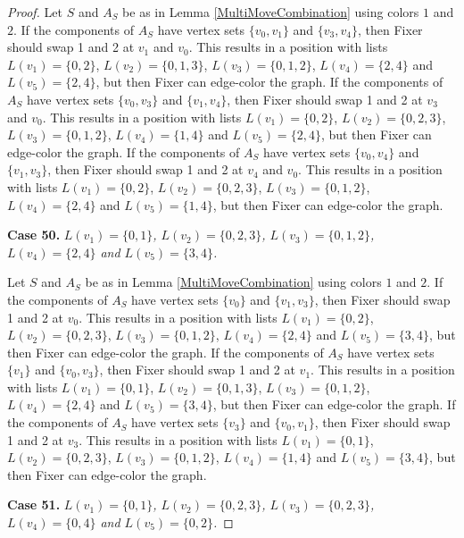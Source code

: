 \documentclass[12pt]{amsart}
\theoremstyle{plain}
\theoremstyle{definition}
\theoremstyle{remark}
\begin{document}
\begin{proof}
Let $S$ and $A_S$ be as in Lemma \ref{MultiMoveCombination} using colors $1$ and $2$. If the components of $A_S$ have vertex sets $\{v_0, v_1\}$ and $\{v_3, v_4\}$, then Fixer should swap 1 and 2 at $v_1$ and $v_0$. This results in a position with lists $L(v_1) = \{0, 2\}$, $L(v_2) = \{0, 1, 3\}$, $L(v_3) = \{0, 1, 2\}$, $L(v_4) = \{2, 4\}$ and $L(v_5) = \{2, 4\}$, but then Fixer can edge-color the graph.
If the components of $A_S$ have vertex sets $\{v_0, v_3\}$ and $\{v_1, v_4\}$, then Fixer should swap 1 and 2 at $v_3$ and $v_0$. This results in a position with lists $L(v_1) = \{0, 2\}$, $L(v_2) = \{0, 2, 3\}$, $L(v_3) = \{0, 1, 2\}$, $L(v_4) = \{1, 4\}$ and $L(v_5) = \{2, 4\}$, but then Fixer can edge-color the graph.
If the components of $A_S$ have vertex sets $\{v_0, v_4\}$ and $\{v_1, v_3\}$, then Fixer should swap 1 and 2 at $v_4$ and $v_0$. This results in a position with lists $L(v_1) = \{0, 2\}$, $L(v_2) = \{0, 2, 3\}$, $L(v_3) = \{0, 1, 2\}$, $L(v_4) = \{2, 4\}$ and $L(v_5) = \{1, 4\}$, but then Fixer can edge-color the graph.

\noindent\textbf{Case 50.  }\textit{$L(v_1) = \{0, 1\}$, $L(v_2) = \{0, 2, 3\}$, $L(v_3) = \{0, 1, 2\}$, $L(v_4) = \{2, 4\}$ and $L(v_5) = \{3, 4\}$.}

Let $S$ and $A_S$ be as in Lemma \ref{MultiMoveCombination} using colors $1$ and $2$. If the components of $A_S$ have vertex sets $\{v_0\}$ and $\{v_1, v_3\}$, then Fixer should swap 1 and 2 at $v_0$. This results in a position with lists $L(v_1) = \{0, 2\}$, $L(v_2) = \{0, 2, 3\}$, $L(v_3) = \{0, 1, 2\}$, $L(v_4) = \{2, 4\}$ and $L(v_5) = \{3, 4\}$, but then Fixer can edge-color the graph.
If the components of $A_S$ have vertex sets $\{v_1\}$ and $\{v_0, v_3\}$, then Fixer should swap 1 and 2 at $v_1$. This results in a position with lists $L(v_1) = \{0, 1\}$, $L(v_2) = \{0, 1, 3\}$, $L(v_3) = \{0, 1, 2\}$, $L(v_4) = \{2, 4\}$ and $L(v_5) = \{3, 4\}$, but then Fixer can edge-color the graph.
If the components of $A_S$ have vertex sets $\{v_3\}$ and $\{v_0, v_1\}$, then Fixer should swap 1 and 2 at $v_3$. This results in a position with lists $L(v_1) = \{0, 1\}$, $L(v_2) = \{0, 2, 3\}$, $L(v_3) = \{0, 1, 2\}$, $L(v_4) = \{1, 4\}$ and $L(v_5) = \{3, 4\}$, but then Fixer can edge-color the graph.

\noindent\textbf{Case 51.  }\textit{$L(v_1) = \{0, 1\}$, $L(v_2) = \{0, 2, 3\}$, $L(v_3) = \{0, 2, 3\}$, $L(v_4) = \{0, 4\}$ and $L(v_5) = \{0, 2\}$.}


\end{proof}
\end{document}
